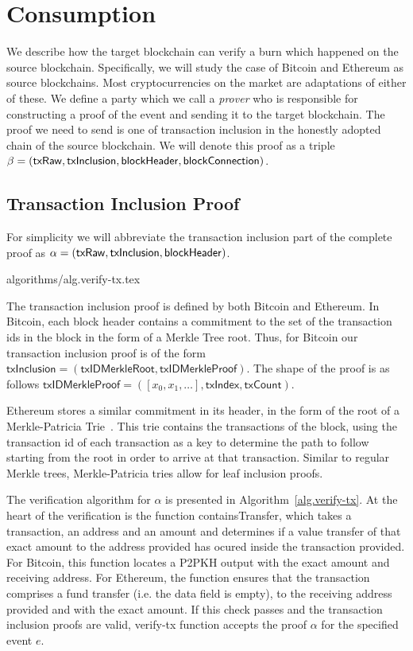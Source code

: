 \section{Consumption}

We describe how the target blockchain can verify a burn which happened on the source blockchain. Specifically, we will study the case of Bitcoin and Ethereum as source blockchains. Most cryptocurrencies on the market are adaptations of either of these. We define a party which we call a \emph{prover} who is responsible for constructing a proof of the event and sending it to the target blockchain. The proof we need to send is one of transaction inclusion in the honestly adopted chain of the source blockchain. We will denote this proof as a triple $\beta = \sf(txRaw, txInclusion, blockHeader, blockConnection)$.

\subsection{Transaction Inclusion Proof}

For simplicity we will abbreviate the transaction inclusion part of the complete proof as $\alpha = \sf(txRaw, txInclusion, blockHeader)$.

{algorithms/alg.verify-tx.tex}

The transaction inclusion proof is defined by both Bitcoin and Ethereum. In Bitcoin, each block header contains a commitment to the set of the transaction ids in the block in the form of a Merkle Tree root. Thus, for Bitcoin our transaction inclusion proof is of the form $\mathsf{txInclusion} = (\mathsf{txIDMerkleRoot}, \mathsf{txIDMerkleProof})$. The shape of the proof is as follows $\mathsf{txIDMerkleProof} = ([x_0, x_1, \dots], \mathsf{txIndex}, \mathsf{txCount})$.

Ethereum stores a similar commitment in its header, in the form of the root of a Merkle-Patricia Trie~\cite{wood2014ethereum}. This trie contains the transactions of the block, using the transaction id of each transaction as a key to determine the path to follow starting from the root in order to arrive at that transaction. Similar to regular Merkle trees, Merkle-Patricia tries allow for leaf inclusion proofs.

The verification algorithm for $\alpha$ is presented in Algorithm~\ref{alg.verify-tx}. At the heart of the verification is the function \textsf{containsTransfer}, which takes a transaction, an address and an amount and determines if a value transfer of that exact amount to the address provided has ocured inside the transaction provided. For Bitcoin, this function locates a P2PKH output with the exact amount and receiving address. For Ethereum, the function ensures that the transaction comprises a fund transfer (i.e. the \textsf{data} field is empty), to the receiving address provided and with the exact amount. If this check passes and the transaction inclusion proofs are valid, \textsf{verify-tx} function accepts the proof $\alpha$ for the specified event $e$.

